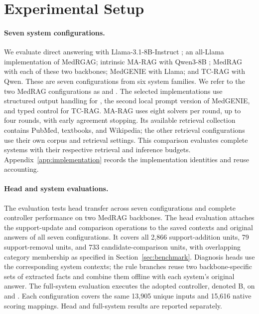 \section{Experimental Setup}
\label{sec:setup}

\paragraph{Seven system configurations.}
We evaluate direct answering with Llama-3.1-8B-Instruct \citep{dubey2024llama}; an all-Llama implementation of MedRGAG; intrinsic MA-RAG with Qwen3-8B \citep{yang2025qwen3}; MedRAG with each of these two backbones; MedGENIE with Llama; and TC-RAG with Qwen. These are seven configurations from six system families. We refer to the two MedRAG configurations as \sysL{} and \sysQ{}. The selected implementations use structured output handling for \sysL{}, the second local prompt version of MedGENIE, and typed control for TC-RAG. MA-RAG uses eight solvers per round, up to four rounds, with early agreement stopping. Its available retrieval collection contains PubMed, textbooks, and Wikipedia; the other retrieval configurations use their own corpus and retrieval settings. This comparison evaluates complete systems with their respective retrieval and inference budgets. Appendix~\ref{app:implementation} records the implementation identities and reuse accounting.

\paragraph{Head and system evaluations.}
The evaluation tests head transfer across seven configurations and complete controller performance on two MedRAG backbones. The head evaluation attaches the support-update and comparison operations to the saved contexts and original answers of all seven configurations. It covers all 2,866 support-addition units, 79 support-removal units, and 733 candidate-comparison units, with overlapping category membership as specified in Section~\ref{sec:benchmark}. Diagnosis heads use the corresponding system contexts; the rule branches reuse two backbone-specific sets of extracted facts and combine them offline with each system's original answer. The full-system evaluation executes the adopted \cfmoa{} controller, denoted B, on \sysL{} and \sysQ{}. Each configuration covers the same 13,905 unique inputs and 15,616 native scoring mappings. Head and full-system results are reported separately.

